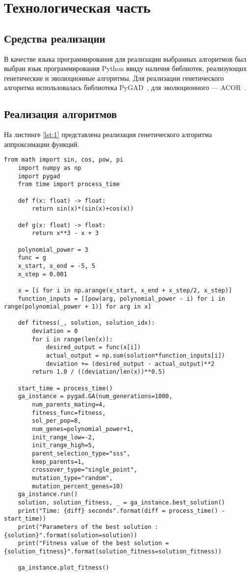 \chapter{Технологическая часть}

\section{Средства реализации}

В качестве языка программирования для реализации выбранных алгоритмов был выбран язык программирования Python \cite{pythonlang} ввиду наличия библиотек, реализующих генетические и эволюционные алгоритмы. Для реализации генетического алгоритма использовалась библиотека PyGAD~\cite{pygad}, для эволюционного --- ACOR~\cite{acor}.

\section{Реализация алгоритмов}

На листинге \ref{lst:1} представлена реализация генетического алгоритма аппроксимации функций.

\begin{lstlisting}[label=lst:1,caption=Генетический алгоритм аппроксимации функций]
	from math import sin, cos, pow, pi
	import numpy as np
	import pygad
	from time import process_time
	
	def f(x: float) -> float:
		return sin(x)*(sin(x)+cos(x))
	
	def g(x: float) -> float:
		return x**3 - x + 3
	
	polynomial_power = 3
	func = g
	x_start, x_end = -5, 5
	x_step = 0.001
	
	x = [i for i in np.arange(x_start, x_end + x_step/2, x_step)]
	function_inputs = [[pow(arg, polynomial_power - i) for i in range(polynomial_power + 1)] for arg in x]
	
	def fitness(_, solution, solution_idx):
		deviation = 0
		for i in range(len(x)):
			desired_output = func(x[i])
			actual_output = np.sum(solution*function_inputs[i])
			deviation += (desired_output - actual_output)**2
		return 1.0 / ((deviation/len(x))**0.5)
	
	start_time = process_time()
	ga_instance = pygad.GA(num_generations=1000,
		num_parents_mating=4,
		fitness_func=fitness,
		sol_per_pop=8,
		num_genes=polynomial_power+1,
		init_range_low=-2,
		init_range_high=5,
		parent_selection_type="sss",
		keep_parents=1,
		crossover_type="single_point",
		mutation_type="random",
		mutation_percent_genes=10)
	ga_instance.run()
	solution, solution_fitness, _ = ga_instance.best_solution()
	print("Time: {diff} seconds".format(diff = process_time() - start_time))
	print("Parameters of the best solution : {solution}".format(solution=solution))
	print("Fitness value of the best solution = {solution_fitness}".format(solution_fitness=solution_fitness))
	
	ga_instance.plot_fitness()
\end{lstlisting}

